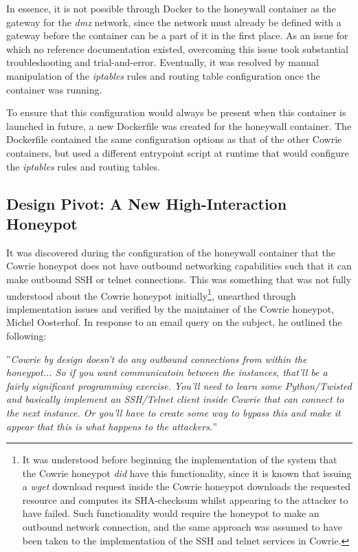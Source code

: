     In essence, it is not possible through Docker to the honeywall container as the gateway for the \textit{dmz} network, since the network must already be defined with a gateway before the container can be a part of it in the first place. As an issue for which no reference documentation existed, overcoming this issue took substantial troubleshooting and trial-and-error. Eventually, it was resolved by manual manipulation of the \textit{iptables} rules and routing table configuration once the container was running.
    
    To ensure that this configuration would always be present when this container is launched in future,  a new Dockerfile was created for the honeywall container. The Dockerfile contained the same configuration options as that of the other Cowrie containers, but used a different entrypoint script at runtime that would configure the \textit{iptables} rules and routing tables.


\subsection{Design Pivot: A New High-Interaction Honeypot}\label{DesignPivot1}
     
    It was discovered during the configuration of the honeywall container that the Cowrie honeypot does not have outbound networking capabilities such that it can make outbound SSH or telnet connections. This was something that was not fully understood about the Cowrie honeypot initially\footnote{It was understood before beginning the implementation of the system that the Cowrie honeypot \textit{did} have this functionality, since it is known that issuing a \textit{wget} download request inside the Cowrie honeypot downloads the requested resource and computes its SHA-checksum whilst appearing to the attacker to have failed. Such functionality would require the honeypot to make an outbound network connection, and the same approach was assumed to have been taken to the implementation of the SSH and telnet services in Cowrie.}, unearthed through implementation issues and verified by the maintainer of the Cowrie honeypot, Michel Oosterhof. In response to an email query on the subject, he outlined the following:
    
\begin{center}
''\textit{Cowrie by design doesn't do any outbound connections from within the honeypot... So if you want communicatoin between the instances, that'll be a fairly significant programming exercise. You'll need to learn some Python/Twisted and basically implement an SSH/Telnet client inside Cowrie that can connect to the next instance. Or you'll have to create some way to bypass this and make it appear that this is what happens to the attackers.}''
\end{center}    

